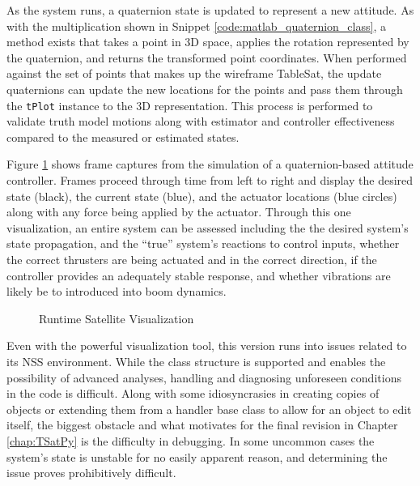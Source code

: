 As the system runs, a quaternion state is updated to represent a new attitude.  As with the multiplication shown in Snippet \ref{code:matlab_quaternion_class}, a method exists that takes a point in 3D space, applies the rotation represented by the quaternion, and returns the transformed point coordinates.  When performed against the set of points that makes up the wireframe TableSat, the update quaternions can update the new locations for the points and pass them through the \verb|tPlot| instance to the 3D representation.  This process is performed to validate truth model motions along with estimator and controller effectiveness compared to the measured or estimated states.

Figure \ref{fig:RuntimeSatelliteVisualization} shows frame captures from the simulation of a quaternion-based attitude controller.  Frames proceed through time from left to right and display the desired state (black), the current state (blue), and the actuator locations (blue circles) along with any force being applied by the actuator.  Through this one visualization, an entire system can be assessed including the the desired system's state propagation, and the ``true'' system's reactions to control inputs, whether the correct thrusters are being actuated and in the correct direction, if the controller provides an adequately stable response, and whether vibrations are likely be to introduced into boom dynamics.

\begin{figure}[ht]
  \centerline{}
  \caption{Runtime Satellite Visualization}
  \label{fig:RuntimeSatelliteVisualization}
\end{figure}

Even with the powerful visualization tool, this version runs into issues related to its NSS environment.  While the class structure is supported and enables the possibility of advanced analyses, handling and diagnosing unforeseen conditions in the code is difficult.  Along with some idiosyncrasies in creating copies of objects or extending them from a handler base class to allow for an object to edit itself, the biggest obstacle and what motivates for the final revision in Chapter \ref{chap:TSatPy} is the difficulty in debugging.  In some uncommon cases the system's state is unstable for no easily apparent reason, and determining the issue proves prohibitively difficult.
